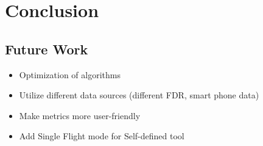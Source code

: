 \chapter{Conclusion} \label{ch:conclusion}



\section{Future Work} \label{sec:future_work}

	\begin{itemize}
    	\item Optimization of algorithms
        \item Utilize different data sources (different FDR, smart phone data)
        \item Make metrics more user-friendly
        \item Add Single Flight mode for Self-defined tool
    \end{itemize}